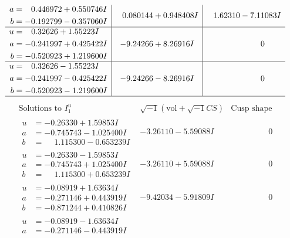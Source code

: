 \documentclass[1p]{elsarticle_modified}
\theoremstyle{definition}
\newcommand{\I}{\sqrt{-1}}
\begin{document}
$$\begin{array}{c|c|c}
\begin{aligned}
a &= \phantom{-}0.446972 + 0.550746 I \\
b &= -0.192799 - 0.357060 I\end{aligned}
 & \phantom{-}0.080144 + 0.948408 I & \phantom{-}1.62310 - 7.11083 I \\ \hline\begin{aligned}
u &= \phantom{-}0.32626 + 1.55223 I \\
a &= -0.241997 + 0.425422 I \\
b &= -0.520923 + 1.219600 I\end{aligned}
 & -9.24266 + 8.26916 I & \phantom{-0.000000 } 0 \\ \hline\begin{aligned}
u &= \phantom{-}0.32626 - 1.55223 I \\
a &= -0.241997 - 0.425422 I \\
b &= -0.520923 - 1.219600 I\end{aligned}
 & -9.24266 - 8.26916 I & \phantom{-0.000000 } 0\\
 \hline 
 \end{array}$$\newpage$$\begin{array}{c|c|c}  
\text{Solutions to }I^u_{1}& \I (\text{vol} + \sqrt{-1}CS) & \text{Cusp shape}\\
 \hline 
\begin{aligned}
u &= -0.26330 + 1.59853 I \\
a &= -0.745743 - 1.025400 I \\
b &= \phantom{-}1.115300 - 0.653239 I\end{aligned}
 & -3.26110 - 5.59088 I & \phantom{-0.000000 } 0 \\ \hline\begin{aligned}
u &= -0.26330 - 1.59853 I \\
a &= -0.745743 + 1.025400 I \\
b &= \phantom{-}1.115300 + 0.653239 I\end{aligned}
 & -3.26110 + 5.59088 I & \phantom{-0.000000 } 0 \\ \hline\begin{aligned}
u &= -0.08919 + 1.63634 I \\
a &= -0.271146 + 0.443919 I \\
b &= -0.871244 + 0.410826 I\end{aligned}
 & -9.42034 - 5.91809 I & \phantom{-0.000000 } 0 \\ \hline\begin{aligned}
u &= -0.08919 - 1.63634 I \\
a &= -0.271146 - 0.443919 I \\

\end{aligned}
\end{array}$$
\end{document}
